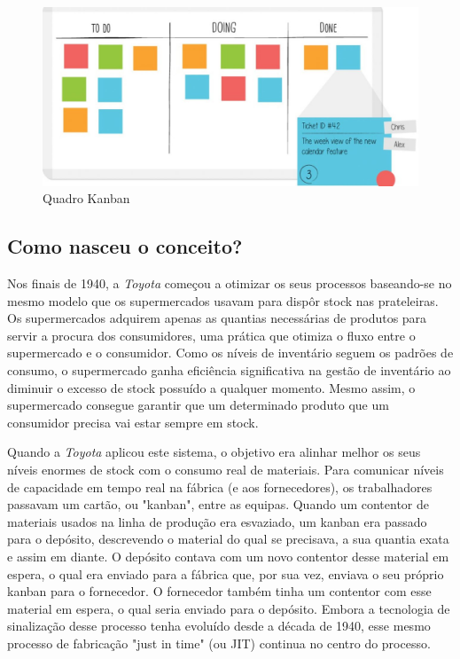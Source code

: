 \begin{figure}[H]
    \centering
    \includegraphics[scale=0.3]{Imagens/kanban.jpg}
    \caption{Quadro Kanban}
    \label{fig:equipascrum}
\end{figure}

\subsection{Como nasceu o conceito?}

Nos finais de 1940, a \textit{Toyota} começou a otimizar os seus processos baseando-se no mesmo modelo que os supermercados usavam para dispôr stock nas prateleiras. Os supermercados adquirem apenas as quantias necessárias de produtos para servir a procura dos consumidores, uma prática que otimiza o fluxo entre o supermercado e o consumidor. Como os níveis de inventário seguem os padrões de consumo, o supermercado ganha eficiência significativa na gestão de inventário ao diminuir o excesso de stock possuído a qualquer momento. Mesmo assim, o supermercado consegue garantir que um determinado produto que um consumidor precisa vai estar sempre em stock.

Quando a \textit{Toyota} aplicou este sistema, o objetivo era alinhar melhor os seus níveis enormes de stock com o consumo real de materiais. Para comunicar níveis de capacidade em tempo real na fábrica (e aos fornecedores), os trabalhadores passavam um cartão, ou "kanban", entre as equipas. Quando um contentor de materiais usados na linha de produção era esvaziado, um kanban era passado para o depósito, descrevendo o material do qual se precisava, a sua quantia exata e assim em diante. O depósito contava com um novo contentor desse material em espera, o qual era enviado para a fábrica que, por sua vez, enviava o seu próprio kanban para o fornecedor. O fornecedor também tinha um contentor com esse material em espera, o qual seria enviado para o depósito. Embora a tecnologia de sinalização desse processo tenha evoluído desde a década de 1940, esse mesmo processo de fabricação "just in time" (ou JIT) continua no centro do processo.

